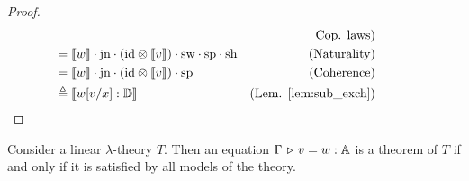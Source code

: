 \begin{proof}
\begin{align*}
  &  \hspace{-30pt} \hspace{10pt} & {\text{Cop. laws})}   \\
  &  \hspace{-30pt} = \llbracket w \rrbracket \comp \text{jn} \comp ( \id \otimes \llbracket v \rrbracket )  \comp  \sw  \comp  \text{sp} \comp \text{sh} & {\text{(Naturality)}}\\
  &   \hspace{-30pt} = \llbracket w \rrbracket \comp \text{jn} \comp ( \id \otimes \llbracket v \rrbracket )  \comp  \text{sp} & {\text{(Coherence)}}\\
  &  \hspace{-30pt} \triangleq \llbracket w[v/x] : \typeD \rrbracket & (\text{Lem. \ref{lem:sub_exch}})
\end{align*}



\end{proof}



\begin{theorem}[Completeness] \label{thm:completeness_classical}
Consider a linear $\lambda$-theory $T$. Then an equation 
$\Gamma \, \triangleright \, v = w : \mathbb{A}$
is a theorem of $T$ if and only if it is satisfied by all models of the theory.
\end{theorem}

